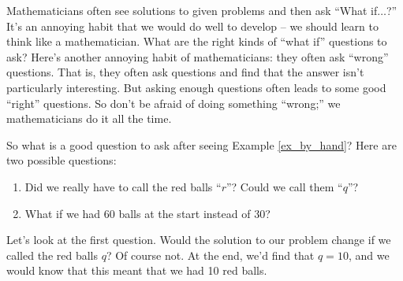 \medskip


Mathematicians often see solutions to given problems and then ask ``What if$\ldots$?'' It's an annoying habit that we would do well to develop -- we should learn to think like a mathematician. What are the right kinds of ``what if'' questions to ask? Here's another annoying habit of mathematicians: they often ask ``wrong'' questions. That is, they often ask questions and find that the answer isn't particularly interesting. But asking enough questions often leads to some good ``right'' questions. So don't be afraid of doing something ``wrong;'' we mathematicians do it all the time.

%

So what is a good question to ask after seeing Example \ref{ex_by_hand}? Here are two possible questions:
		\begin{enumerate}
		\item		Did we really have to call the red balls ``$r$''? Could we call them ``$q$''?
		\item		What if we had 60 balls at the start instead of 30? 
		\end{enumerate}
		
Let's look at the first question. Would the solution to our problem change if we called the red balls $q$? Of course not. At the end, we'd find that $q = 10$, and we would know that this meant that we had 10 red balls. 



